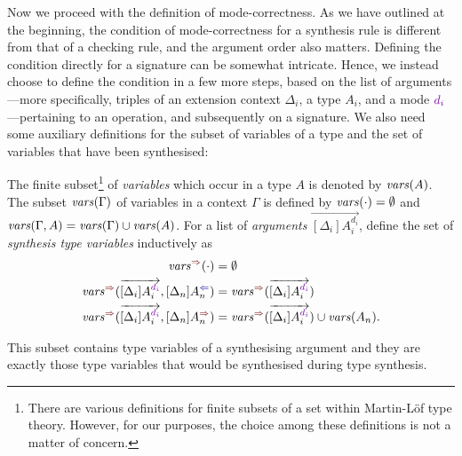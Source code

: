 Now we proceed with the definition of mode-correctness.
As we have outlined at the beginning, the condition of mode-correctness for a synthesis rule is different from that of a checking rule, and the argument order also matters.
Defining the condition directly for a signature can be somewhat intricate.
Hence, we instead choose to define the condition in a few more steps, based on the list of arguments---more specifically, triples of an extension context $\Delta_i$, a type $A_i$, and a mode $\dir{d_i}$---pertaining to an operation, and subsequently on a signature.
We also need some auxiliary definitions for the subset of variables of a type and the set of variables that have been synthesised:
\begin{definition}
  The finite subset\footnote{%
  There are various definitions for finite subsets of a set within Martin-L\"{o}f type theory.
  However, for our purposes, the choice among these definitions is not a matter of concern.}
  of \emph{variables} which occur in a type $A$ is denoted by $\mathit{vars}(A)$.
  The subset $\mathit{vars}(\Gamma)$ of variables in a context $\Gamma$ is defined by $\mathit{vars}(\cdot) = \emptyset$ and $\mathit{vars}(\Gamma, A) = \mathit{vars}(\Gamma) \cup \mathit{vars}(A)$.
  For a list of \emph{arguments} $\overrightarrow{[\Delta_i]A_i^{d_i}}$, define the set of \emph{synthesis type variables} inductively as 
  \begin{align*}
    \synvar(\cdot)                                  & = \emptyset  \\
    \synvar(\overrightarrow{[\Delta_i]A_i^{\dir{d_i}}}, [\Delta_{n}] A_{n}^{\dir{\chk}}) & = 
    \synvar(\overrightarrow{[\Delta_i]A_i^{\dir{d_i}}}) \\
    \synvar(\overrightarrow{[\Delta_i]A_i^{\dir{d_i}}}, [\Delta_{n}] A_{n}^{\dir{\syn}}) & = 
    \synvar(\overrightarrow{[\Delta_i]A_i^{\dir{d_i}}}) \cup \fv(A_{n}).
  \end{align*}
\end{definition}
This subset contains type variables of a synthesising argument and they are exactly those type variables that would be synthesised during type synthesis.

